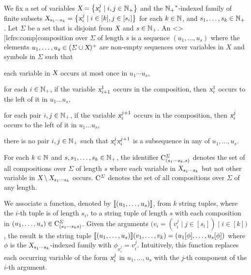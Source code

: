 \documentclass[../../document.tex]{subfiles}
\begin{document}
    \begin{definition}[Compositions]\label{def:lcfrs:comp}
        We fix a set of variables \(\textsl{X} = \big\{ \textsl{x}_i^j \mid i, j \in \mathbb{N}_+ \big\}\) and the \({\mathbb{N}_+}^*\)-indexed family of finite subsets \(\textsl{X}_{s_1\cdots s_k} = \big\{ \textsl{x}_i^j \mid i \in [k], j \in [s_i] \big\}\) for each \(k \in \mathbb{N}\), and \(s_1, \ldots, s_k \in \mathbb{N}_+\).
        Let \(\varSigma\) be a set that is disjoint from \(\textsl{X}\) and \(s \in \mathbb{N}_+\).
        An  <\lcfrs>[lcfrs:comp]{composition} over \(\varSigma\) of length \(s\) is a sequence \((u_1, \ldots, u_s)\) where the elements \(u_1, \dots, u_s \in (\varSigma \cup \textsl{X})^+\) are non-empty sequences over variables in \(X\) and symbols in \(\varSigma\) such that
        \begin{compactenum}
            \item each variable in \(\textsl{X}\) occurs at most once in \(u_1 \cdots u_s\),
            \item for each \(i \in \mathbb{N}_+\), if the variable \(\textsl{x}_{i+1}^1\) occurs in the composition, then \(\textsl{x}_i^1\) occurs to the left of it in \(u_1 \ldots u_s\),
            \item for each pair \(i, j \in \mathbb{N}_+\), if the variable \(\textsl{x}_i^{j+1}\) occurs in the composition, then \(\textsl{x}_i^j\) occurs to the left of it in \(u_1 \ldots u_s\),
            \item there is no pair \(i, j \in \mathbb{N}_+\) such that \(\textsl{x}^j_i\textsl{x}^{j+1}_i\) is a subsequence in any of \(u_1, \ldots, u_s\).
        \end{compactenum}
        For each \(k\in \mathbb{N}\) and \(s, s_1, \ldots, s_k \in \mathbb{N}_+\), the identifier \(\mathrm{C}^\varSigma_{(s_1\cdots s_k, s)}\) denotes the set of all  compositions over \(\varSigma\) of length \(s\) where each variable in \(\textsl{X}_{s_1 \cdots s_k}\) but not other variable in \(\textsl{X} \setminus \textsl{X}_{s_1\cdots s_k}\) occurs.
        \(\mathrm{C}^\varSigma\) denotes the set of all  compositions over \(\varSigma\) of any length.

        We associate a function, denoted by \(\llbracket(u_1, \ldots, u_s)\rrbracket\), from \(k\) string tuples, where the \(i\)-th tuple is of length \(s_i\), to a string tuple of length \(s\) with each composition in \((u_1, \ldots, u_s) \in \mathrm{C}^\varSigma_{(s_1\cdots s_k s)}\).
        Given the arguments \(\big(v_i = (v_i^j \mid j \in [s_i]) \mid i \in [k]\big)\), the result is the string tuple \(
        \llbracket(u_1, \ldots, u_s)\rrbracket(v_1, \ldots, v_k) = (u_1[\phi], \ldots, u_s[\phi])
        \) where \(\phi\) is the \(\textsl{X}_{s_1 \cdots s_k}\)-indexed family with \(\phi_{x_i^j} = v_i^j\).
        Intuitively, this function replaces each occurring variable of the form \(\textsl{x}_i^j\) in \(u_1, \ldots, u_s\) with the \(j\)-th component of the \(i\)-th argument.
    \end{definition}
\end{document}
